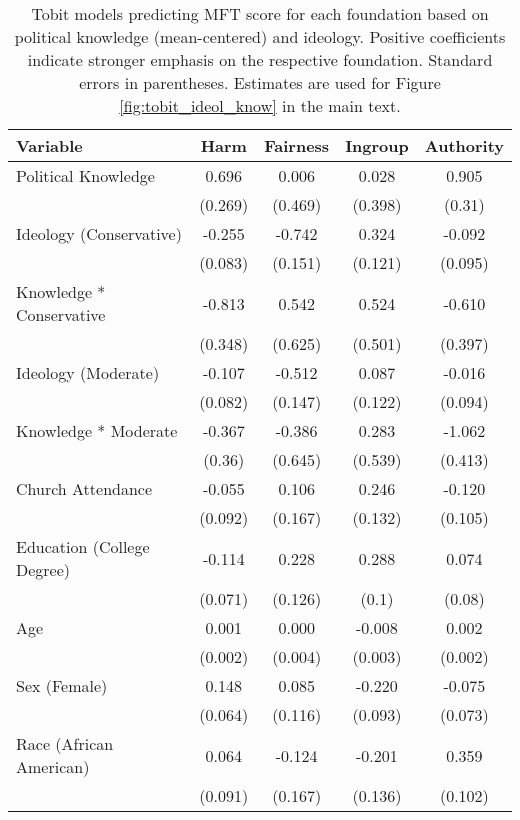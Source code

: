 \begin{table}[ht]
\centering
\caption{Tobit models predicting MFT score for each foundation based 
           on political knowledge (mean-centered) and ideology. Positive coefficients indicate stronger 
           emphasis on the respective foundation. Standard errors in parentheses. Estimates are used 
           for Figure \ref{fig:tobit_ideol_know} in the main text.} 
\label{tab:tobit_ideol_know}
\begingroup\footnotesize
\begin{tabular}{lcccc}
  \hline
Variable & Harm & Fairness & Ingroup & Authority \\ 
  \hline
Political Knowledge &  0.696 &  0.006 &  0.028 &  0.905 \\ 
   & (0.269) & (0.469) & (0.398) & (0.31) \\ 
  Ideology (Conservative) & -0.255 & -0.742 &  0.324 & -0.092 \\ 
   & (0.083) & (0.151) & (0.121) & (0.095) \\ 
  Knowledge * Conservative & -0.813 &  0.542 &  0.524 & -0.610 \\ 
   & (0.348) & (0.625) & (0.501) & (0.397) \\ 
  Ideology (Moderate) & -0.107 & -0.512 &  0.087 & -0.016 \\ 
   & (0.082) & (0.147) & (0.122) & (0.094) \\ 
  Knowledge * Moderate & -0.367 & -0.386 &  0.283 & -1.062 \\ 
   & (0.36) & (0.645) & (0.539) & (0.413) \\ 
  Church Attendance & -0.055 &  0.106 &  0.246 & -0.120 \\ 
   & (0.092) & (0.167) & (0.132) & (0.105) \\ 
  Education (College Degree) & -0.114 &  0.228 &  0.288 &  0.074 \\ 
   & (0.071) & (0.126) & (0.1) & (0.08) \\ 
  Age &  0.001 &  0.000 & -0.008 &  0.002 \\ 
   & (0.002) & (0.004) & (0.003) & (0.002) \\ 
  Sex (Female) &  0.148 &  0.085 & -0.220 & -0.075 \\ 
   & (0.064) & (0.116) & (0.093) & (0.073) \\ 
  Race (African American) &  0.064 & -0.124 & -0.201 &  0.359 \\ 
   & (0.091) & (0.167) & (0.136) & (0.102) \\ 

\end{tabular}
\end{table}
